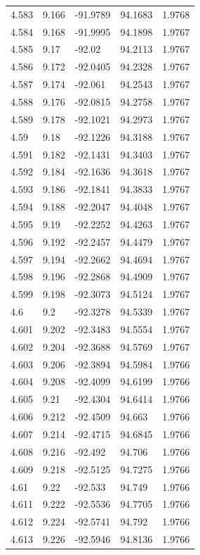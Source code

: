 \begin{tabular}{lllll}
4.583 & 9.166 & -91.9789 & 94.1683 & 1.9768 \\
4.584 & 9.168 & -91.9995 & 94.1898 & 1.9767 \\
4.585 & 9.17 & -92.02 & 94.2113 & 1.9767 \\
4.586 & 9.172 & -92.0405 & 94.2328 & 1.9767 \\
4.587 & 9.174 & -92.061 & 94.2543 & 1.9767 \\
4.588 & 9.176 & -92.0815 & 94.2758 & 1.9767 \\
4.589 & 9.178 & -92.1021 & 94.2973 & 1.9767 \\
4.59 & 9.18 & -92.1226 & 94.3188 & 1.9767 \\
4.591 & 9.182 & -92.1431 & 94.3403 & 1.9767 \\
4.592 & 9.184 & -92.1636 & 94.3618 & 1.9767 \\
4.593 & 9.186 & -92.1841 & 94.3833 & 1.9767 \\
4.594 & 9.188 & -92.2047 & 94.4048 & 1.9767 \\
4.595 & 9.19 & -92.2252 & 94.4263 & 1.9767 \\
4.596 & 9.192 & -92.2457 & 94.4479 & 1.9767 \\
4.597 & 9.194 & -92.2662 & 94.4694 & 1.9767 \\
4.598 & 9.196 & -92.2868 & 94.4909 & 1.9767 \\
4.599 & 9.198 & -92.3073 & 94.5124 & 1.9767 \\
4.6 & 9.2 & -92.3278 & 94.5339 & 1.9767 \\
4.601 & 9.202 & -92.3483 & 94.5554 & 1.9767 \\
4.602 & 9.204 & -92.3688 & 94.5769 & 1.9767 \\
4.603 & 9.206 & -92.3894 & 94.5984 & 1.9766 \\
4.604 & 9.208 & -92.4099 & 94.6199 & 1.9766 \\
4.605 & 9.21 & -92.4304 & 94.6414 & 1.9766 \\
4.606 & 9.212 & -92.4509 & 94.663 & 1.9766 \\
4.607 & 9.214 & -92.4715 & 94.6845 & 1.9766 \\
4.608 & 9.216 & -92.492 & 94.706 & 1.9766 \\
4.609 & 9.218 & -92.5125 & 94.7275 & 1.9766 \\
4.61 & 9.22 & -92.533 & 94.749 & 1.9766 \\
4.611 & 9.222 & -92.5536 & 94.7705 & 1.9766 \\
4.612 & 9.224 & -92.5741 & 94.792 & 1.9766 \\
4.613 & 9.226 & -92.5946 & 94.8136 & 1.9766 \\

\end{tabular}
